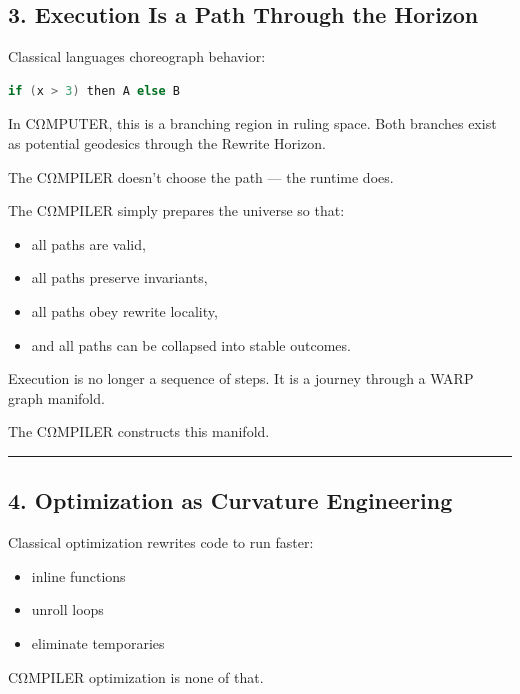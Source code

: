 \subsection{3. Execution Is a Path Through the
Horizon}\label{execution-is-a-path-through-the-horizon}

Classical languages choreograph behavior:

\begin{lstlisting}[language=C]
if (x > 3) then A else B
\end{lstlisting}

In CΩMPUTER, this is a branching region in ruling space. Both branches
exist as potential geodesics through the Rewrite Horizon.

The CΩMPILER doesn't choose the path --- the runtime does.

The CΩMPILER simply prepares the universe so that:

\begin{itemize}
\tightlist
\item
  all paths are valid,
\item
  all paths preserve invariants,
\item
  all paths obey rewrite locality,
\item
  and all paths can be collapsed into stable outcomes.
\end{itemize}

Execution is no longer a sequence of steps. It is a journey through a
WARP graph manifold.

The CΩMPILER constructs this manifold.

\begin{center}\rule{0.5\linewidth}{0.5pt}\end{center}

\subsection{4. Optimization as Curvature
Engineering}\label{optimization-as-curvature-engineering}

Classical optimization rewrites code to run faster:

\begin{itemize}
\tightlist
\item
  inline functions
\item
  unroll loops
\item
  eliminate temporaries
\end{itemize}

CΩMPILER optimization is none of that.

